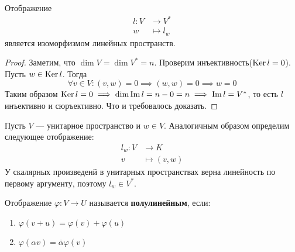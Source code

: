 \documentclass[../main.tex]{subfiles}
\begin{document}
\begin{theorem-non}
\label{non:8.12}
  Отображение
  \begin{align*}
    l\colon V &\to V^{*} \\
            w &\mapsto l_w
  \end{align*}
  является изоморфизмом линейных пространств.
\end{theorem-non}
\begin{proof}
  Заметим, что $\dim V = \dim V^{*} = n$. Проверим инъективность($\operatorname{Ker} l = 0$). Пусть $w \in \operatorname{Ker} l$. Тогда
  \begin{equation*}
    \forall v \in V\colon (v, w) = 0 \implies (w, w) = 0 \implies w = 0
  \end{equation*}
  Таким образом $\operatorname{Ker} l = 0 \implies \dim \operatorname{Im} l = n - 0 = n \implies \operatorname{Im} l = V^{*}$, то есть $l$ инъективно и сюръективно. Что и требовалось доказать.
\end{proof}

Пусть $V$ --- унитарное пространство и $w \in V$. Аналогичным образом определим следующее отображение:
\begin{align*}
  l_w\colon V &\to K \\
            v &\mapsto (v, w)
\end{align*}
У скалярных произведенй в унитарных пространствах верна линейность по первому аргументу, поэтому $l_w \in V^{*}$.
\begin{definition}
  Отображение $\varphi\colon V \to U$ называется \textbf{полулинейным}, если:
  \begin{enumerate}
    \item $\varphi(v + u) = \varphi(v) + \varphi(u)$
    \item $\varphi(\alpha v) = \overline{\alpha} \varphi(v)$
  \end{enumerate}
\end{definition}
\end{document}
